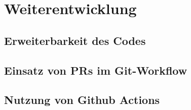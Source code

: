 \chapter{Weiterentwicklung}
\label{ch:weiterentwicklung}

\section{Erweiterbarkeit des Codes}
\label{sec:erweiterbarkeit}


\section{Einsatz von PRs im Git-Workflow}
\label{sec:git-workflow}


\section{Nutzung von Github Actions}
\label{sec:github-actions}

